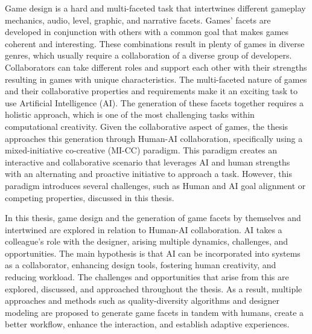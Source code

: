 \documentclass[hidelinks,green,onecolumn,twoside]{dissertation}
\begin{document}
Game design is a hard and multi-faceted task that intertwines different gameplay mechanics, audio, level, graphic, and narrative facets. Games' facets are developed in conjunction with others with a common goal that makes games coherent and interesting. These combinations result in plenty of games in diverse genres, which usually require a collaboration of a diverse group of developers. Collaborators can take different roles and support each other with their strengths resulting in games with unique characteristics. The multi-faceted nature of games and their collaborative properties and requirements make it an exciting task to use Artificial Intelligence (AI). The generation of these facets together requires a holistic approach, which is one of the most challenging tasks within computational creativity. Given the collaborative aspect of games, the thesis approaches this generation through Human-AI collaboration, specifically using a mixed-initiative co-creative (MI-CC) paradigm. This paradigm creates an interactive and collaborative scenario that leverages AI and human strengths with an alternating and proactive initiative to approach a task. However, this paradigm introduces several challenges, such as Human and AI goal alignment or competing properties, discussed in this thesis. 

In this thesis, game design and the generation of game facets by themselves and intertwined are explored in relation to Human-AI collaboration. AI takes a colleague's role with the designer, arising multiple dynamics, challenges, and opportunities. The main hypothesis is that AI can be incorporated into systems as a collaborator, enhancing design tools, fostering human creativity, and reducing workload. The challenges and opportunities that arise from this are explored, discussed, and approached throughout the thesis. As a result, multiple approaches and methods such as quality-diversity algorithms and designer modeling are proposed to generate game facets in tandem with humans, create a better workflow, enhance the interaction, and establish adaptive experiences.
\end{document}
